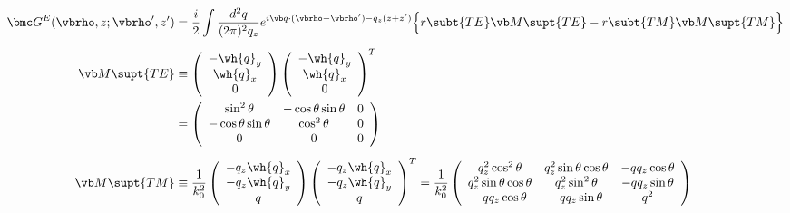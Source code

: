 \documentclass[letterpaper]{article}
\begin{document}
\begin{align*}
\bmc G^{E}(\vbrho, z; \vbrho^\prime, z^\prime)
&=\frac{i}{2}\int \frac{d^2 q}{(2\pi)^2 q_z}
  e^{i\vb q \cdot (\vbrho-\vbrho^\prime) - q_z(z+z^\prime)}
  \Big\{ r\subt{TE} \vb M\supt{TE} - r\subt{TM} \vb M\supt{TM} \Big\}
\\[5pt]
 \vb M\supt{TE}
&\equiv
 \left(\begin{array}{c}
 -\wh{q}_y \\ \wh{q}_x \\ 0 
 \end{array}\right)
 \left(\begin{array}{c}
 -\wh{q}_y \\ \wh{q}_x \\ 0 
 \end{array}\right)^T
\\
&=\left(\begin{array}{ccc}
  \sin^2 \theta & -\cos\theta \sin\theta & 0 \\
  -\cos\theta \sin\theta & \cos^2 \theta & 0 \\
  0 & 0 & 0 
  \end{array}\right)
\\[5pt]
 \vb M\supt{TM}
&\equiv
 \frac{1}{k_0^2}
 \left(\begin{array}{c}
  -q_z \wh{q}_x \\
  -q_z \wh{q}_y \\
   q   
 \end{array}\right)
 \left(\begin{array}{c}
  -q_z \wh{q}_x \\
  -q_z \wh{q}_y \\
   q   
 \end{array}\right)^T
= \frac{1}{k_0^2}
  \left(\begin{array}{ccc}
  q_z^2 \cos^2 \theta          & q_z^2 \sin\theta \cos\theta & -q q_z \cos\theta \\
  q_z^2 \sin \theta \cos\theta & q_z^2 \sin^2\theta          & -q q_z \sin\theta \\
  -q q_z \cos\theta            & -q q_z \sin\theta           & q^2
  \end{array}\right)
\end{align*}
\end{document}
